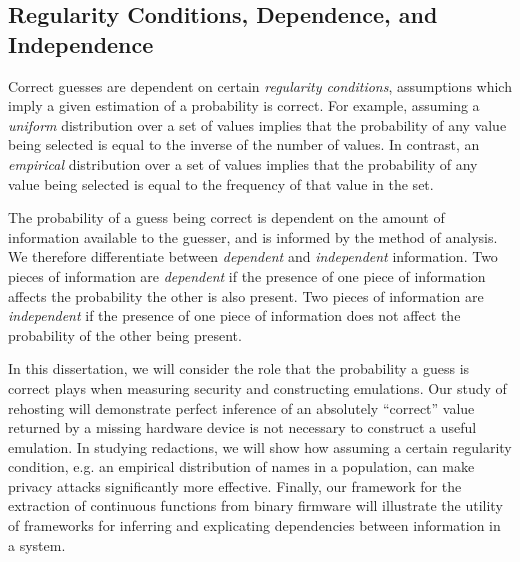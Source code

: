 \subsection{Regularity Conditions, Dependence, and Independence}

Correct guesses are dependent on certain \emph{regularity conditions}, assumptions which imply a given estimation of a probability is correct.
For example, assuming a \emph{uniform} distribution over a set of values implies that the probability of any value being selected is equal to the inverse of the number of values.
In contrast, an \emph{empirical} distribution over a set of values implies that the probability of any value being selected is equal to the frequency of that value in the set.

The probability of a guess being correct is dependent on the amount of information available to the guesser, and is informed by the method of analysis.
We therefore differentiate between \emph{dependent} and \emph{independent} information.
Two pieces of information are \emph{dependent} if the presence of one piece of information affects the probability the other is also present.
Two pieces of information are \emph{independent} if the presence of one piece of information does not affect the probability of the other being present.

In this dissertation, we will consider the role that the probability a guess is correct plays when measuring security and constructing emulations.
Our study of rehosting will demonstrate perfect inference of an absolutely ``correct'' value returned by a missing hardware device is not necessary to construct a useful emulation.
In studying redactions, we will show how assuming a certain regularity condition, e.g. an empirical distribution of names in a population, can make privacy attacks significantly more effective.
Finally, our framework for the extraction of continuous functions from binary firmware will illustrate the utility of frameworks for inferring and explicating dependencies between information in a system.
